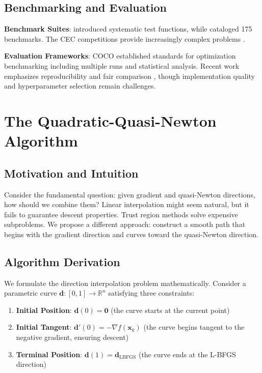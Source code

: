 \hypertarget{benchmarking-and-evaluation}{%
\subsection{Benchmarking and Evaluation}\label{benchmarking-and-evaluation}}

\textbf{Benchmark Suites}: \citet{dejong1975analysis} introduced systematic test functions, while \citet{jamil2013literature} cataloged 175 benchmarks.
The CEC competitions provide increasingly complex problems \citep{liang2013problem}.

\textbf{Evaluation Frameworks}: COCO \citep{hansen2016coco} established standards for optimization benchmarking including multiple runs and statistical analysis.
Recent work emphasizes reproducibility \citep{beiranvand2017best} and fair comparison \citep{schmidt2021descending}, though implementation quality and hyperparameter selection remain challenges.

\hypertarget{the-quadratic-quasi-newton-algorithm}{%
\section{The Quadratic-Quasi-Newton Algorithm}\label{the-quadratic-quasi-newton-algorithm}}

\hypertarget{motivation-and-intuition}{%
\subsection{Motivation and Intuition}\label{motivation-and-intuition}}

Consider the fundamental question: given gradient and quasi-Newton directions, how should we combine them?
Linear interpolation might seem natural, but it fails to guarantee descent properties.
Trust region methods solve expensive subproblems.
We propose a different approach: construct a smooth path that begins with the gradient direction and curves toward the quasi-Newton direction.

\hypertarget{algorithm-derivation}{%
\subsection{Algorithm Derivation}\label{algorithm-derivation}}

We formulate the direction interpolation problem mathematically. Consider a parametric curve
\(\mathbf{d}: [0,1] \rightarrow \mathbb{R}^n\) satisfying three constraints:

\begin{enumerate}
\def\labelenumi{\arabic{enumi}.}
\item
  \textbf{Initial Position}: \(\mathbf{d}(0) = \mathbf{0}\) (the curve starts at the current point)
\item
  \textbf{Initial Tangent}: \(\mathbf{d}'(0) = -\nabla f(\mathbf{x}_k)\) (the curve begins tangent to the negative gradient, ensuring descent)
\item
  \textbf{Terminal Position}: \(\mathbf{d}(1) = \mathbf{d}_{\text{LBFGS}}\) (the curve ends at the L-BFGS direction)
\end{enumerate}

